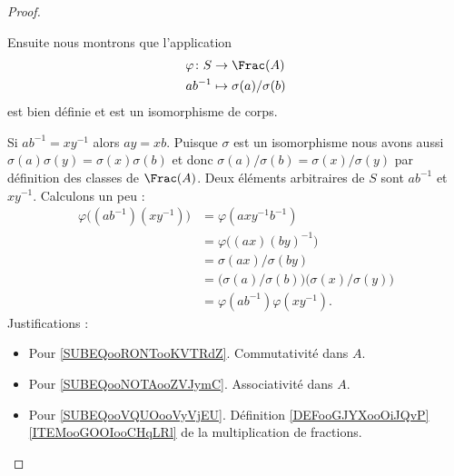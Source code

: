 \begin{proof}
\begin{subproof}


		Ensuite nous montrons que l'application
		\begin{equation}
			\begin{aligned}
				\varphi\colon S & \to \Frac(A)                \\
				ab^{-1}         & \mapsto \sigma(a)/\sigma(b)
			\end{aligned}
		\end{equation}
		est bien définie et est un isomorphisme de corps.


		Si \( ab^{-1}=xy^{-1}\) alors \( ay=xb\). Puisque \( \sigma\) est un isomorphisme nous avons aussi \( \sigma(a)\sigma(y)=\sigma(x)\sigma(b)\) et donc \( \sigma(a)/\sigma(b)=\sigma(x)/\sigma(y)\) par définition des classes de \( \Frac(A)\).
		\spitem[Morphisme]
		Deux éléments arbitraires de \( S\) sont \( ab^{-1}\) et \( xy^{-1}\). Calculons un peu :
		\begin{subequations}
			\begin{align}
				\varphi\big( (ab^{-1})(xy^{-1}) \big) & =\varphi(axy^{-1}b^{-1})      \label{SUBEQooRONTooKVTRdZ}                                          \\
				                                      & =\varphi\big( (ax)(by)^{-1} \big)      \label{SUBEQooNOTAooZVJymC}                                 \\
				                                      & =\sigma(ax)/\sigma(by)                                                                             \\
				                                      & =\big(\sigma(a)/\sigma(b)\big)\big(\sigma(x)/\sigma(y)\big)            \label{SUBEQooVQUOooVyVjEU} \\
				                                      & =\varphi(ab^{-1})\varphi(xy^{-1}).
			\end{align}
		\end{subequations}
		Justifications :
		\begin{itemize}
			\item Pour \eqref{SUBEQooRONTooKVTRdZ}. Commutativité dans \( A\).
			\item Pour \eqref{SUBEQooNOTAooZVJymC}. Associativité dans \( A\).
			\item Pour \eqref{SUBEQooVQUOooVyVjEU}. Définition \ref{DEFooGJYXooOiJQvP}\ref{ITEMooGOOIooCHqLRl} de la multiplication de fractions.
		\end{itemize}



\end{subproof}
\end{proof}
